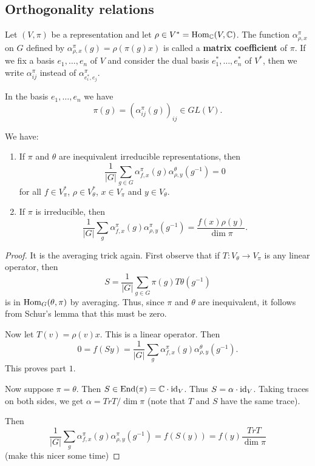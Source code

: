 \documentclass[11pt, english]{article}
\begin{document}
\subsection{Orthogonality relations}

Let $(V,\pi)$ be a representation and let $\rho \in V^\ast = \operatorname{Hom}_{\mathbb{C}}(V,\mathbb{C})$. The function $\alpha_{\rho,x}^\pi$ on $G$ defined by $\alpha_{\rho,x}^\pi(g)=\rho(\pi(g)x)$ is called a \textbf{matrix coefficient} of $\pi$. If we fix a basis $e_1,\ldots,e_n$ of $V$ and consider the dual basis $e_1^\ast,\ldots, e_n^\ast$ of $V^\ast$, then we write $\alpha_{ij}^\pi$ instead of $\alpha_{e_i^\ast,e_j}^\pi$.

In the basis $e_1,\ldots,e_n$ we have
$$
\pi(g) = \left( \alpha_{ij}^\pi(g) \right)_{ij} \in GL(V).
$$

\begin{thm}
 We have:
 \begin{enumerate}
 \item If $\pi$ and $\theta$ are inequivalent irreducible representations, then
\[
\frac 1{\lvert G \rvert} \sum_{g \in G} \alpha_{f,x}^\pi(g) \alpha_{\rho,y}^\theta(g^{-1}) = 0
\]
for all $f \in V_\pi^\ast$, $\rho \in V_\theta^\ast$, $x \in V_\pi$ and $y \in V_\theta$.
\item If $\pi$ is irreducible, then
\[
\frac{1}{\lvert G \rvert} \sum_g \alpha_{f,x}^\pi(g) \alpha_{\rho,y}^\pi (g^{-1}) = \frac{f(x) \rho(y)}{\dim \pi}.
\]
 \end{enumerate}
\end{thm}
\begin{proof}
It is the averaging trick again. First observe that if $T:V_\theta \to V_\pi$ is any linear operator, then 
\[
S = \frac{1}{\lvert G \rvert} \sum_{g \in G} \pi(g) T \theta(g^{-1}) 
\]
is in $\operatorname{Hom}_G(\theta,\pi)$ by averaging. Thus, since $\pi$ and $\theta$ are inequivalent, it follows from Schur's lemma that this must be zero.

Now let $T(v) = \rho(v)x$. This is a linear operator. Then
$$
0 = f(Sy) = \frac{1}{\lvert G \rvert} \sum_g \alpha_{f,x}^\pi (g) \alpha_{\rho,y}^\theta(g^{-1}).
$$
This proves part $1$.

Now suppose $\pi=\theta$. Then $S \in \operatorname{End}(\pi) = \mathbb{C} \cdot \text{id}_V$. Thus $S = \alpha \cdot \text{id}_V$. Taking traces on both sides, we get $\alpha = Tr T/\dim \pi$ (note that $T$ and $S$ have the same trace).

Then
$$
\frac 1{\lvert G \rvert} \sum_g \alpha_{f,x}^\pi(g) \alpha_{\rho,y}^\pi(g^{-1}) = f(S(y)) = f(y) \frac{Tr T}{\dim \pi}
$$
(make this nicer some time)
\end{proof}
\end{document}
